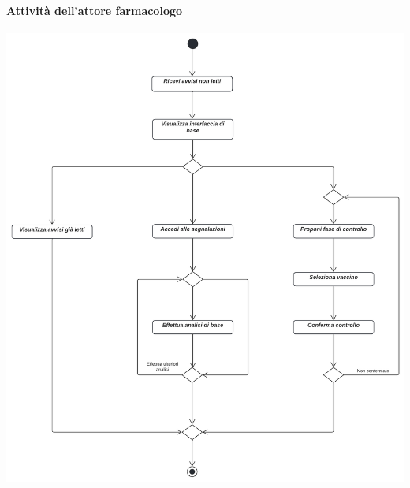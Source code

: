\documentclass{article}
\begin{document}
\paragraph*{Attività dell'attore farmacologo}
\begin{center}
    \includegraphics[width=1\textwidth]{pictures/ActivityDiagram_Farmacologo.png}
\end{center}


\newpage
\end{document}
